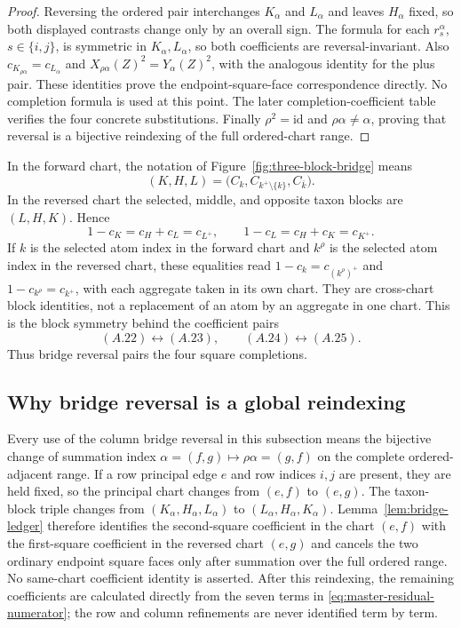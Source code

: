 \documentclass[11pt]{article}
\begin{document}
\begin{proof}
Reversing the ordered pair interchanges $K_\alpha$ and $L_\alpha$ and leaves
$H_\alpha$ fixed, so
both displayed contrasts change only by an overall sign.  The formula for
each $r_s^\alpha$, $s\in\{i,j\}$, is symmetric in
$K_\alpha,L_\alpha$, so both coefficients are reversal-invariant.  Also
$c_{K_{\rho\alpha}}=c_{L_\alpha}$ and
$X_{\rho\alpha}(Z)^2=Y_\alpha(Z)^2$, with the analogous identity for the plus
pair.  These identities prove the endpoint-square-face correspondence
directly.  No completion formula is used at this point.  The later
completion-coefficient table verifies the four concrete substitutions.
Finally
$\rho^2=\mathrm{id}$ and
$\rho\alpha\ne\alpha$, proving that reversal is a bijective reindexing of the
full ordered-chart range.
\end{proof}

In the forward chart, the notation of
Figure~\ref{fig:three-block-bridge} means
\[
(K,H,L)=\bigl(C_k,C_{k^+\setminus\{k\}},C_{\bar k}\bigr).
\]
In the reversed chart the selected, middle, and opposite taxon blocks are
$(L,H,K)$.  Hence
\[
1-c_K=c_H+c_L=c_{L^+},\qquad
1-c_L=c_H+c_K=c_{K^+}.
\]
If $k$ is the selected atom index in the forward chart and $k^\rho$ is the
selected atom index in the reversed chart, these equalities read
$1-c_k=c_{(k^\rho)^+}$ and $1-c_{k^\rho}=c_{k^+}$, with each aggregate taken
in its own chart.  They are cross-chart block identities, not a replacement
of an atom by an aggregate in one chart.
This is the block symmetry behind the coefficient pairs
\[
(A.22)\longleftrightarrow(A.23),\qquad
(A.24)\longleftrightarrow(A.25).
\]
Thus bridge reversal pairs the four square completions.

\subsection{Why bridge reversal is a global reindexing}\label{subsec:sym-red}

Every use of the column bridge reversal in this subsection means the
bijective change of summation index
$\alpha=(f,g)\mapsto\rho\alpha=(g,f)$ on the complete ordered-adjacent
range.  If a row principal edge $e$ and row indices $i,j$ are present, they
are held fixed, so the principal chart changes from $(e,f)$ to $(e,g)$.
The taxon-block triple changes from $(K_\alpha,H_\alpha,L_\alpha)$ to
$(L_\alpha,H_\alpha,K_\alpha)$.  Lemma~\ref{lem:bridge-ledger} therefore
identifies the second-square coefficient in the chart $(e,f)$ with the
first-square coefficient in the reversed chart $(e,g)$ and cancels the two
ordinary endpoint square faces only after summation over the full ordered
range.
No same-chart coefficient identity is asserted.  After this reindexing, the
remaining coefficients are calculated directly from the seven terms in
\eqref{eq:master-residual-numerator}; the row and column refinements are never
identified term by term.
\end{document}
